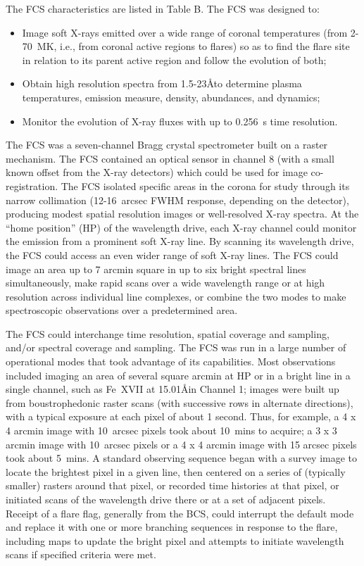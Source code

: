 The FCS characteristics are listed in Table B. The FCS was designed to:
\begin{itemize}
\item	 Image soft X-rays emitted over a wide range of coronal
	  temperatures (from 2-70~MK, i.e., from coronal active regions to
	  flares) so as to find the flare site in relation to its parent active
	  region and follow the evolution of both;

\item	 Obtain high resolution spectra from 1.5-23\AA to determine plasma
	  temperatures, emission measure, density, abundances, and dynamics;

\item	 Monitor the evolution of X-ray fluxes with up to 0.256~s time
          resolution.
\end{itemize}

The FCS was a seven-channel Bragg crystal spectrometer built on a raster
mechanism. The FCS contained an optical sensor in channel 8 (with a small known
offset from the X-ray detectors) which could be used for image co-registration.
The FCS isolated specific areas in the corona for study through its narrow
collimation  (12-16~arcsec FWHM response, depending on the detector),
producing modest spatial resolution images or well-resolved X-ray spectra. At
the ``home position'' (HP) of the wavelength drive, each X-ray channel could
monitor the emission from a prominent soft X-ray line. By scanning its
wavelength drive, the FCS could access an even wider range of soft X-ray lines.
The FCS could image an area up to 7 arcmin square in up to six bright spectral
lines simultaneously, make rapid scans over a wide wavelength range or at high
resolution across individual line complexes, or combine the two modes to make
spectroscopic observations over a predetermined area.

The FCS could interchange time resolution, spatial coverage and sampling,
and/or spectral coverage and sampling. The FCS was run in a large number of
operational modes that took advantage of its capabilities.  Most observations
included imaging an area of several square arcmin at HP or in a bright line in
a single channel, such as Fe~XVII at 15.01\AA in Channel 1; images were built
up  from boustrophedonic raster scans (with successive rows in alternate
directions), with a typical exposure at each pixel of about 1 second. Thus,
for example, a 4 x 4 arcmin image with 10~arcsec pixels took about 10~mins to
acquire; a 3 x 3 arcmin image with 10~arcsec pixels or a 4 x 4 arcmin image
with 15 arcsec pixels took about 5~mins.  A standard observing sequence began
with a survey image to locate the brightest pixel in a given line, then
centered on a series of (typically smaller) rasters around that pixel, or
recorded time histories at that pixel, or initiated scans of the wavelength
drive there or at a set of adjacent pixels. Receipt of a flare flag, generally
from the BCS, could interrupt the default mode and replace it with one or more
branching sequences in response to the flare, including maps to update the
bright pixel and attempts to initiate wavelength scans if specified criteria
were met.

